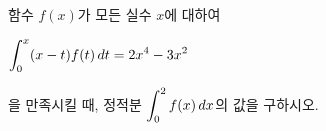 함수 $f(x)$가 모든 실수 $x$에 대하여 \par\smallskip\noindent\hspace*{1.5em}$\displaystyle\int_{0}^{x}(x-t)f(t)\mkern3mu dt=2x^4-3x^2$\par\smallskip\noindent 을 만족시킬 때, 정적분 $\displaystyle\int_{0}^{2}f(x)\mkern3mu dx$의 값을 구하시오.
